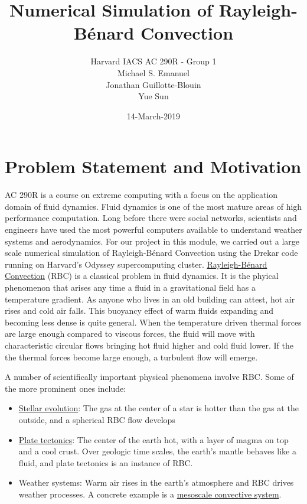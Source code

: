 \documentclass[11pt]{article} %
\title{Numerical Simulation of Rayleigh-B\'enard Convection}
\author{Harvard IACS AC 290R - Group 1 \\
Michael S. Emanuel \\
Jonathan Guillotte-Blouin \\
Yue Sun \\
}
\date{14-March-2019}
\begin{document}
\maketitle

\section{Problem Statement and Motivation}
AC 290R is a course on extreme computing with a focus on the application domain of fluid dynamics.
Fluid dynamics is one of the most mature areas of high performance computation.
Long before there were social networks, scientists and engineers have used 
the most powerful computers available to understand weather systems and aerodynamics.
For our project in this module, we carried out a large scale numerical simulation of 
Rayleigh-B\'enard Convection using the Drekar code running on Harvard's Odyssey supercomputing cluster.  
\href{https://en.wikipedia.org/wiki/Rayleigh%E2\%80%93B%C3%A9nard_convection}
{Rayleigh-B\'enard Convection} (RBC) is a classical problem in fluid dynamics.
It is the phyical phenomenon that arises any time a fluid in a gravitational field has a temperature gradient.
As anyone who lives in an old building can attest, hot air rises and cold air falls.  
This buoyancy effect of warm fluids expanding and becoming less dense is quite general.
When the temperature driven thermal forces are large enough compared to viscous forces,
the fluid will move with characteristic circular flows bringing hot fluid higher and cold fluid lower.
If the the thermal forces become large enough, a turbulent flow will emerge.

A number of scientifically important physical phenomena involve RBC.
Some of the more prominent ones include:
\begin{itemize}
\item\href{https://en.wikipedia.org/wiki/Stellar_evolution}{Stellar evolution}:
The gas at the center of a star is hotter than the gas at the outside, and a spherical RBC flow develops
\item\href{https://en.wikipedia.org/wiki/Plate_tectonics}{Plate tectonics}:
The center of the earth hot, with a layer of magma on top and a cool crust.  
Over geologic time scales, the earth's mantle behaves like a fluid, and plate tectonics is an instance of RBC.
\item{Weather systems}: Warm air rises in the earth's atmosphere and RBC drives weather processes. 
A concrete example is a \href{https://en.wikipedia.org/wiki/Mesoscale_convective_system}{mesoscale convective system}.
\end{itemize}
\end{document}
